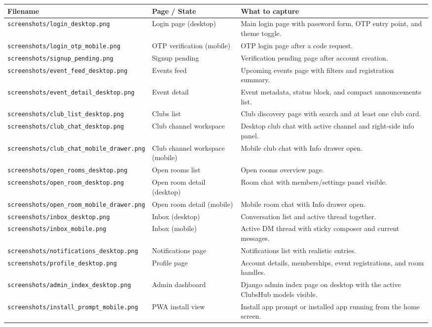 \documentclass[11pt,a4paper]{article}
\begin{document}
\renewcommand{\arraystretch}{1.2}
\begin{longtable}{>{\raggedright\arraybackslash}p{} >{\raggedright\arraybackslash}p{} >{\raggedright\arraybackslash}p{}}
\toprule
\textbf{Filename} & \textbf{Page / State} & \textbf{What to capture} \\
\midrule
\endhead

\texttt{screenshots/login\_desktop.png} & Login page (desktop) & Main login page with password form, OTP entry point, and theme toggle. \\
\texttt{screenshots/login\_otp\_mobile.png} & OTP verification (mobile) & OTP login page after a code request. \\
\texttt{screenshots/signup\_pending.png} & Signup pending & Verification pending page after account creation. \\
\texttt{screenshots/event\_feed\_desktop.png} & Events feed & Upcoming events page with filters and registration summary. \\
\texttt{screenshots/event\_detail\_desktop.png} & Event detail & Event metadata, status block, and compact announcements list. \\
\texttt{screenshots/club\_list\_desktop.png} & Clubs list & Club discovery page with search and at least one club card. \\
\texttt{screenshots/club\_chat\_desktop.png} & Club channel workspace & Desktop club chat with active channel and right-side info panel. \\
\texttt{screenshots/club\_chat\_mobile\_drawer.png} & Club channel workspace (mobile) & Mobile club chat with Info drawer open. \\
\texttt{screenshots/open\_rooms\_desktop.png} & Open rooms list & Open rooms overview page. \\
\texttt{screenshots/open\_room\_desktop.png} & Open room detail (desktop) & Room chat with members/settings panel visible. \\
\texttt{screenshots/open\_room\_mobile\_drawer.png} & Open room detail (mobile) & Mobile room chat with Info drawer open. \\
\texttt{screenshots/inbox\_desktop.png} & Inbox (desktop) & Conversation list and active thread together. \\
\texttt{screenshots/inbox\_mobile.png} & Inbox (mobile) & Active DM thread with sticky composer and current messages. \\
\texttt{screenshots/notifications\_desktop.png} & Notifications page & Notifications list with realistic entries. \\
\texttt{screenshots/profile\_desktop.png} & Profile page & Account details, memberships, event registrations, and room handles. \\
\texttt{screenshots/admin\_index\_desktop.png} & Admin dashboard & Django admin index page on desktop with the active ClubsHub models visible. \\
\texttt{screenshots/install\_prompt\_mobile.png} & PWA install view & Install app prompt or installed app running from the home screen. \\
\bottomrule
\end{longtable}
\end{document}
